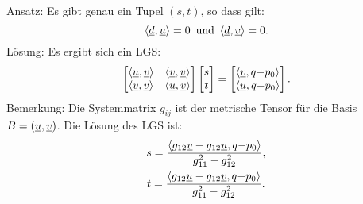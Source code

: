 Ansatz: Es gibt genau ein Tupel $(s,t)$, so dass gilt:
\begin{equation}
\langle\underline{d},\underline{u}\rangle=0\enspace\text{und}\enspace
\langle\underline{d},\underline{v}\rangle=0.
\end{equation}
Lösung: Es ergibt sich ein LGS:
\begin{equation}
\begin{bmatrix}
\langle\underline{u},\underline{v}\rangle & \langle\underline{v},\underline{v}\rangle\\
\langle\underline{v},\underline{v}\rangle & \langle\underline{u},\underline{v}\rangle
\end{bmatrix}
\begin{bmatrix}
s\\ t
\end{bmatrix}
= \begin{bmatrix}
\langle\underline{v},q{-}p_0\rangle\\
\langle\underline{u},q{-}p_0\rangle
\end{bmatrix}.
\end{equation}
Bemerkung: Die Systemmatrix $g_{ij}$ ist der metrische Tensor für die
Basis $B=(\underline{u},\underline{v})$. Die Lösung des LGS ist:
\begin{gather}
s = \frac
  {\langle g_{12}\underline{v}-g_{12}\underline{u}, q{-}p_0\rangle}
  {g_{11}^2-g_{12}^2},\\
t = \frac
  {\langle g_{12}\underline{u}-g_{12}\underline{v}, q{-}p_0\rangle}
  {g_{11}^2-g_{12}^2}.
\end{gather}

